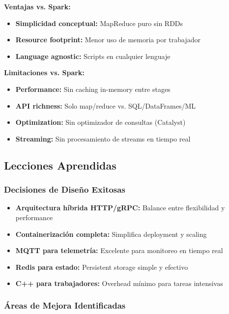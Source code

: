 \textbf{Ventajas vs. Spark:}
\begin{itemize}
    \item \textbf{Simplicidad conceptual:} MapReduce puro sin RDDs
    \item \textbf{Resource footprint:} Menor uso de memoria por trabajador
    \item \textbf{Language agnostic:} Scripts en cualquier lenguaje
\end{itemize}

\textbf{Limitaciones vs. Spark:}
\begin{itemize}
    \item \textbf{Performance:} Sin caching in-memory entre stages
    \item \textbf{API richness:} Solo map/reduce vs. SQL/DataFrames/ML
    \item \textbf{Optimization:} Sin optimizador de consultas (Catalyst)
    \item \textbf{Streaming:} Sin procesamiento de streams en tiempo real
\end{itemize}

\subsection{Lecciones Aprendidas}

\subsubsection{Decisiones de Diseño Exitosas}

\begin{itemize}
    \item \textbf{Arquitectura híbrida HTTP/gRPC:} Balance entre flexibilidad y performance
    \item \textbf{Containerización completa:} Simplifica deployment y scaling
    \item \textbf{MQTT para telemetría:} Excelente para monitoreo en tiempo real
    \item \textbf{Redis para estado:} Persistent storage simple y efectivo
    \item \textbf{C++ para trabajadores:} Overhead mínimo para tareas intensivas
\end{itemize}

\subsubsection{Áreas de Mejora Identificadas}

